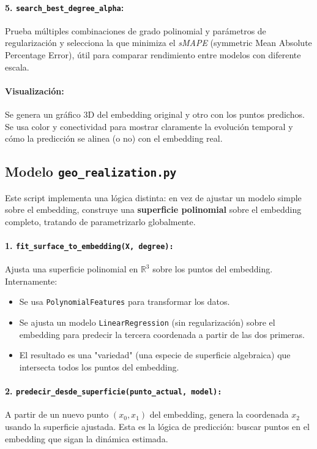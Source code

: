 \paragraph{5. \texttt{search\_best\_degree\_alpha}:} Prueba múltiples combinaciones de grado polinomial y parámetros de regularización y selecciona la que minimiza el \textit{sMAPE} (symmetric Mean Absolute Percentage Error), útil para comparar rendimiento entre modelos con diferente escala.

\paragraph{Visualización:} Se genera un gráfico 3D del embedding original y otro con los puntos predichos. Se usa color y conectividad para mostrar claramente la evolución temporal y cómo la predicción se alinea (o no) con el embedding real.

\subsection*{Modelo \texttt{geo\_realization.py}}

Este script implementa una lógica distinta: en vez de ajustar un modelo simple sobre el embedding, construye una \textbf{superficie polinomial} sobre el embedding completo, tratando de parametrizarlo globalmente.

\paragraph{1. \texttt{fit\_surface\_to\_embedding(X, degree):}} Ajusta una superficie polinomial en $\mathbb{R}^3$ sobre los puntos del embedding. Internamente:
\begin{itemize}
    \item Se usa \texttt{PolynomialFeatures} para transformar los datos.
    \item Se ajusta un modelo \texttt{LinearRegression} (sin regularización) sobre el embedding para predecir la tercera coordenada a partir de las dos primeras.
    \item El resultado es una "variedad" (una especie de superficie algebraica) que intersecta todos los puntos del embedding.
\end{itemize}

\paragraph{2. \texttt{predecir\_desde\_superficie(punto\_actual, model):}} A partir de un nuevo punto $(x_0, x_1)$ del embedding, genera la coordenada $x_2$ usando la superficie ajustada. Esta es la lógica de predicción: buscar puntos en el embedding que sigan la dinámica estimada.

